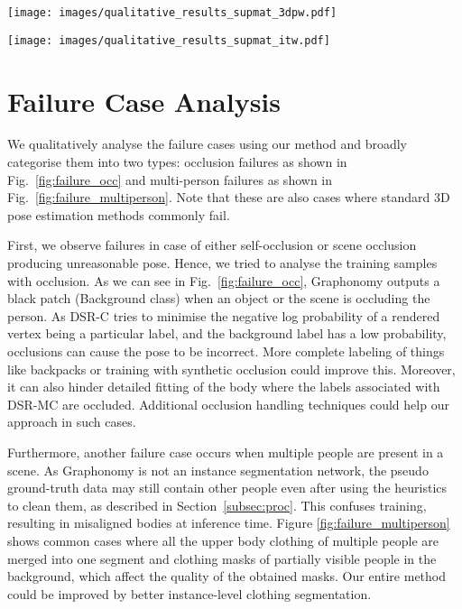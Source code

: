 \documentclass[10pt,twocolumn,letterpaper]{article}
\newcommand{\modelname}[0]{DSR\xspace}
\begin{document}
\begin{figure*}[th]
    \texttt{[image: images/qualitative\_results\_supmat\_3dpw.pdf]}
    \caption{\textbf{Additional Qualitative Results of 3DPW.} From left to right - Input image, SPIN~\cite{spin}, SPIN Sideview, EFT~\cite{eft}, EFT Sideview, {\modelname} and \modelname Sideview  results}
    \label{fig:additional_qual_3dpw}
\end{figure*}

\begin{figure*}[th]
    \texttt{[image: images/qualitative\_results\_supmat\_itw.pdf]}
    \caption{\textbf{Additional Qualitative Results of COCO.} From left to right - Input image, SPIN~\cite{spin}, SPIN Sideview, EFT~\cite{eft}, EFT Sideview, {\modelname} and \modelname Sideview  results}
    \label{fig:additional_qual_coco}
\end{figure*}

\section{Failure Case Analysis}
We qualitatively analyse the failure cases using our method and broadly categorise them into two types: occlusion failures as shown in Fig.~\ref{fig:failure_occ} and multi-person failures as shown in Fig.~\ref{fig:failure_multiperson}. Note that these are also cases where standard 3D pose estimation methods commonly fail.

First, we observe failures in case of either self-occlusion or scene occlusion producing unreasonable pose. Hence, we tried to analyse the training samples with occlusion. As we can see in Fig.~\ref{fig:failure_occ}, Graphonomy outputs a black patch (Background class) when an object or the scene is occluding the person. As \modelname-C tries to minimise the negative log probability of a rendered vertex being a particular label, and the background label has a low probability, occlusions can cause the pose to be incorrect.
More complete labeling of things like backpacks or training with synthetic occlusion could improve this.
Moreover, it can also hinder detailed fitting of the body where the labels associated with \modelname-MC are occluded. Additional occlusion handling techniques could help our approach in such cases.

Furthermore, another failure case occurs when multiple people are present in a scene. As Graphonomy is not an instance segmentation network, the pseudo ground-truth data may still contain other people even after using the heuristics to clean them, as described in Section~\ref{subsec:proc}. This confuses training, resulting in misaligned bodies at inference time. Figure \ref{fig:failure_multiperson} shows common cases where all the upper body clothing of multiple people are merged into one segment and clothing masks of partially visible people in the background, which affect the quality of the obtained masks.
Our entire method could be improved by better instance-level clothing segmentation.
\end{document}
